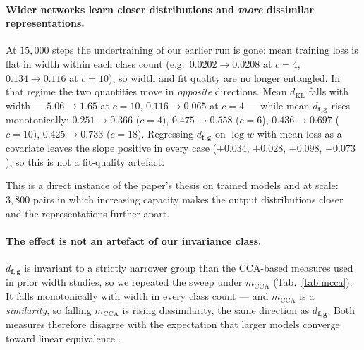 \documentclass[10pt,letterpaper,twocolumn]{article}
\newcommand{\bff}{\mathbf{f}}
\newcommand{\bfg}{\mathbf{g}}
\newcommand{\dKL}{d_{\mathrm{KL}}}
\newcommand{\dfg}{d_{\bff,\bfg}}
\newcommand{\mCCA}{m_{\mathrm{CCA}}}
\theoremstyle{plain}
\theoremstyle{definition}
\theoremstyle{remark}
\begin{document}
\paragraph{Wider networks learn closer distributions and \emph{more}
dissimilar representations.}
At $15{,}000$ steps the undertraining of our earlier run is gone: mean training
loss is flat in width within each class count (e.g.\ $0.0202\to0.0208$ at
$c{=}4$, $0.134\to0.116$ at $c{=}10$), so width and fit quality are no longer
entangled. In that regime the two quantities move in \emph{opposite}
directions. Mean $\dKL$ falls with width --- $5.06\to1.65$ at $c{=}10$,
$0.116\to0.065$ at $c{=}4$ --- while mean $\dfg$ rises monotonically:
$0.251\to0.366$ ($c{=}4$), $0.475\to0.558$ ($c{=}6$), $0.436\to0.697$
($c{=}10$), $0.425\to0.733$ ($c{=}18$). Regressing $\dfg$ on $\log w$ with mean
loss as a covariate leaves the slope positive in every case
($+0.034$, $+0.028$, $+0.098$, $+0.073$), so this is not a fit-quality
artefact.

This is a direct instance of the paper's thesis on trained models and at scale:
$3{,}800$ pairs in which increasing capacity makes the output distributions
closer and the representations further apart.

\paragraph{The effect is not an artefact of our invariance class.}
$\dfg$ is invariant to a strictly narrower group than the CCA-based measures
used in prior width studies, so we repeated the sweep under
$\mCCA$ (Tab.~\ref{tab:mcca}). It falls monotonically with width in every
class count --- and $\mCCA$ is a \emph{similarity}, so falling $\mCCA$ is
rising dissimilarity, the same direction as $\dfg$. Both measures therefore
disagree with the expectation that larger models converge toward linear
equivalence \cite{roeder2021}.
\end{document}
